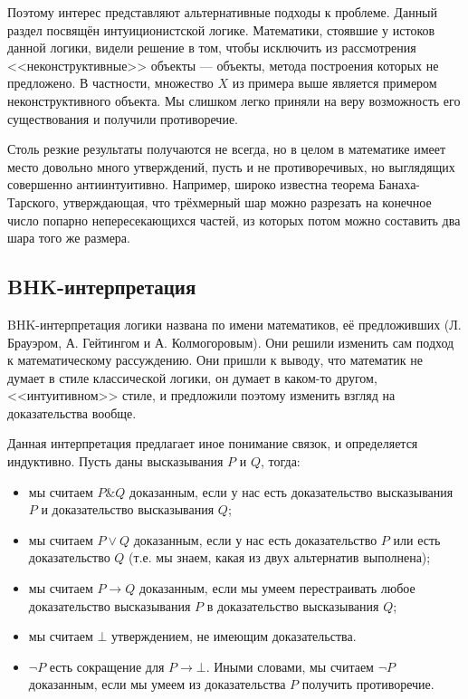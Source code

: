 Поэтому интерес представляют альтернативные подходы к проблеме. Данный раздел посвящён 
интуиционистской логике. Математики, стоявшие у истоков данной логики, видели решение в том,
чтобы исключить из рассмотрения <<неконструктивные>> объекты --- объекты, метода построения
которых не предложено. В частности, множество $X$ из примера выше является примером 
неконструктивного объекта. Мы слишком легко приняли на веру возможность его существования и
получили противоречие.

Столь резкие результаты получаются не всегда, но в целом в математике имеет место 
довольно много утверждений, пусть и не противоречивых, но выглядящих совершенно антиинтуитивно.
Например, широко известна теорема Банаха-Тарского, утверждающая, что трёхмерный шар можно 
разрезать на конечное число попарно непересекающихся частей, из которых потом можно составить
два шара того же размера.

\subsection*{BHK-интерпретация}

BHK-интерпретация логики названа по имени математиков, её предложивших 
(Л. Брауэром, А. Гейтингом и А. Колмогоровым). 
Они решили изменить сам подход к математическому рассуждению. Они пришли к выводу,
что математик не думает в стиле классической логики, он думает в каком-то другом, 
<<интуитивном>> стиле, и предложили поэтому изменить взгляд на доказательства вообще.

Данная интерпретация предлагает иное понимание
связок, и определяется индуктивно. Пусть даны высказывания $P$ и $Q$, тогда:

\begin{itemize}
\item мы считаем $P \& Q$ доказанным, если у нас есть доказательство 
высказывания $P$ и доказательство высказывания $Q$;
\item мы считаем $P \vee Q$ доказанным, если у нас есть доказательство $P$ или 
есть доказательство $Q$ (т.е. мы знаем, какая из двух альтернатив выполнена);
\item мы считаем $P \rightarrow Q$ доказанным, если мы умеем перестраивать любое 
доказательство высказывания $P$ в доказательство высказывания $Q$;
\item мы считаем $\bot$ утверждением, не имеющим доказательства.
\item $\neg P$ есть сокращение для $P \rightarrow \bot$. Иными словами, мы считаем 
$\neg P$ доказанным, если мы умеем из доказательства $P$ получить противоречие.
\end{itemize}

